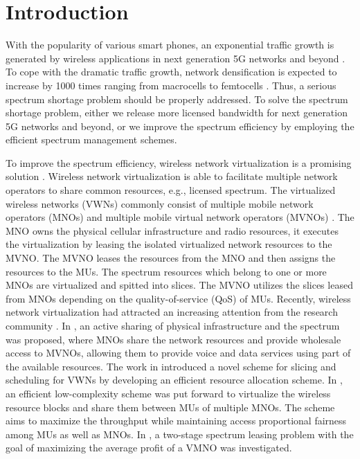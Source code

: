 \documentclass[journal]{IEEEtran}
\begin{document}
\section{Introduction}

With the popularity of various smart phones, an exponential traffic growth is generated by wireless applications in next generation 5G networks and beyond \cite{NPanwar,DingZ14,LiY17,LiY18}. To cope with the dramatic traffic growth, network densification is expected to increase by 1000 times ranging from macrocells to femtocells \cite{AYDing}. Thus, a serious spectrum shortage problem should be properly addressed. To solve the spectrum shortage problem, either we release more licensed bandwidth for next generation 5G networks and beyond, or we improve the spectrum efficiency by employing the efficient spectrum management schemes.

To improve the spectrum efficiency, wireless network virtualization is a promising solution \cite{CLiang,LZhao,3GPP}. Wireless network virtualization is able to facilitate multiple network operators to share common resources, e.g., licensed spectrum. The virtualized wireless networks (VWNs) commonly consist of multiple mobile network operators (MNOs) and multiple mobile virtual network operators (MVNOs) \cite{RKokku}. The MNO owns the physical cellular infrastructure and radio resources, it executes the virtualization by leasing the isolated virtualized network resources to the MVNO. The MVNO leases the resources from the MNO and then assigns the resources to the MUs. The spectrum resources which belong to one or more MNOs are virtualized and spitted into slices. The MVNO utilizes the slices leased from MNOs depending on the quality-of-service (QoS) of MUs. Recently, wireless network virtualization had attracted an increasing attention from the research community \cite{XCostaPerez,MIKamel,MKalil,YXZhang}. In \cite{XCostaPerez}, an active sharing of physical infrastructure and the spectrum was proposed, where MNOs share the network resources and provide wholesale access to MVNOs, allowing them to provide voice and data services using part of the available resources. The work in \cite{MIKamel} introduced a novel scheme for slicing and scheduling for VWNs by developing an efficient resource allocation scheme. In \cite{MKalil}, an efficient low-complexity scheme was put forward to virtualize the wireless resource blocks and share them between MUs of multiple MNOs. The scheme aims to maximize the throughput while maintaining access proportional fairness among MUs as well as MNOs. In \cite{YXZhang}, a two-stage spectrum leasing problem with the goal of maximizing the average profit of a VMNO was investigated.
\end{document}
